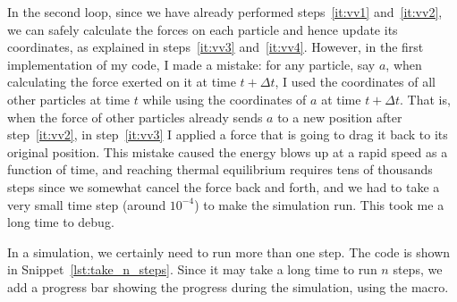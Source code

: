 In the second  loop, since we have already performed steps~\ref{it:vv1}
and~\ref{it:vv2}, we can safely calculate the forces on each particle and hence update its
coordinates, as explained in steps~\ref{it:vv3} and~\ref{it:vv4}.
However, in the first implementation of my code, I made a mistake: for any particle, say $a$,
when calculating the force exerted on it at time $t + \Delta t$, I used the coordinates of
all other particles at time $t$ while using the coordinates of $a$ at time $t + \Delta t$.
That is, when the force of other particles already sends $a$ to a new position after
step~\ref{it:vv2}, in step~\ref{it:vv3} I applied a force that is going to drag it
back to its original position. This mistake caused the energy blows up at a rapid
speed as a function of time, and reaching thermal equilibrium requires tens of thousands
steps since we somewhat cancel the force back and forth, and we had to take a very small
time step (around $10^{-4}$) to make the simulation run. This took me a long time to debug.

In a simulation, we certainly need to run more than one step. The code is shown in
Snippet~\ref{lst:take_n_steps}.
Since it may take a long time to run $n$ steps, we add a progress bar showing the
progress during the simulation, using the  macro.
